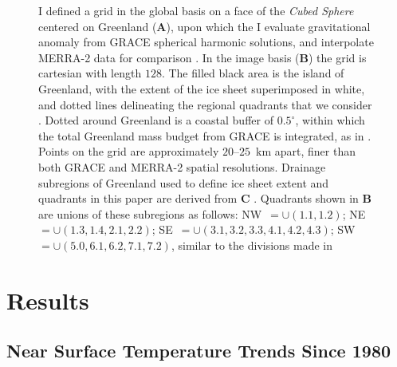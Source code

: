 \documentclass[11pt]{report}
\begin{document}
\begin{figure}[h]
\centering
{}
\caption[The Discrete Grid Around Greenland]{I defined a grid in the global basis on a face of the \textit{Cubed Sphere} centered on Greenland (\textbf{A}), upon which the I evaluate gravitational anomaly from GRACE spherical harmonic solutions, and interpolate MERRA-2 data for comparison \cite[see][]{ronchi1996}. In the image basis (\textbf{B}) the grid is cartesian with length $128$. The filled black area is the island of Greenland, with the extent of the ice sheet superimposed in white, and dotted lines delineating the regional quadrants that we consider \cite[see \textbf{C}~\&][]{zwally2012}. Dotted around Greenland is a coastal buffer of $0.5^{\circ}$, within which the total Greenland mass budget from GRACE is integrated, as in \cite{Harig+2016}. Points on the grid are approximately $20$--$25$~km apart, finer than both GRACE and MERRA-2 spatial resolutions. Drainage subregions of Greenland used to define ice sheet extent and quadrants in this paper are derived from \textbf{C} \cite[figure and data from][]{zwally2012}. Quadrants shown in \textbf{B} are unions of these subregions as follows: NW~$=\cup(1.1, 1.2)$; NE~$=\cup(1.3, 1.4, 2.1, 2.2)$; SE~$=\cup(3.1, 3.2, 3.3, 4.1, 4.2, 4.3)$; SW~$=\cup(5.0,6.1,6.2,7.1,7.2)$, similar to the divisions made in \cite{mcmillan2016} \label{fig:gridbasins}}
\end{figure}

 \section{Results}
 
 \subsection{Near Surface Temperature Trends Since 1980}
 
\end{document}

